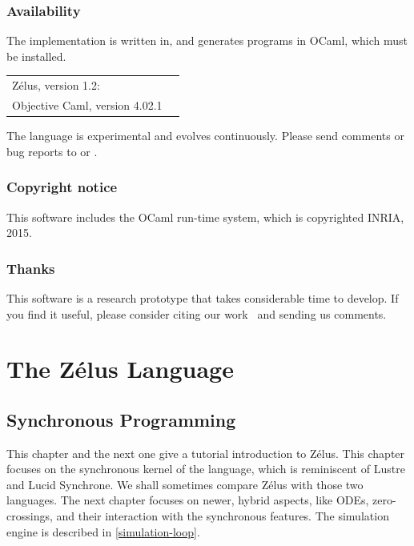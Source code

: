 \documentclass[11pt,titlepage,twoside]{report}
\newcommand{\zelus}{{\sf Z\'elus}}
\newcommand{\lustre}{{\sf Lustre}}
\newcommand{\lucy}{{\sf Lucid Synchrone}}
\newcommand{\ocaml}{{\sf OCaml}}
\begin{document}
\section*{Availability\label{availability}}
The implementation is written in, and generates programs in \ocaml, which 
must be installed.
\begin{center}
\begin{tabular}{ll}
  \zelus, version 1.2:  & 
  \ahrefurl{\url{http://zelus.di.ens.fr}} \\
  Objective Caml, version 4.02.1  & 
  \ahrefurl{\url{http://www.ocaml.org}}
\end{tabular}
\end{center}
The language is experimental and evolves continuously. Please send
comments or bug reports to  or 
. 

\section*{Copyright notice\label{copyright}}
This software includes the \ocaml{} run-time system, which is
copyrighted INRIA, 2015. 

\section*{Thanks\label{thanks}}

This software is a research prototype that takes considerable time to 
develop.
If you find it useful, please consider citing our work~\cite{lucy:hscc13} 
and sending us comments.

\cleardoublepage
\part{The Z\'elus Language\label{zeluslang}}
\cleardoublepage
\chapter{Synchronous Programming\label{syncprog}} %

This chapter and the next one give a tutorial introduction to \zelus. This
chapter focuses on the synchronous kernel of the language, which is 
reminiscent of \lustre{} and \lucy.
We shall sometimes compare \zelus{} with those two languages.
The next chapter focuses on newer, hybrid aspects, like ODEs,
zero-crossings, and their interaction with the synchronous features.
The simulation engine is described in \cref{simulation-loop}.
\end{document}
